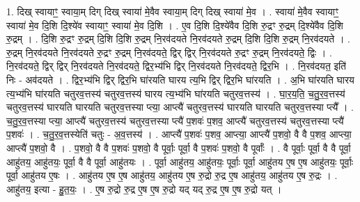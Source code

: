 \documentclass[17pt]{extarticle}
\begin{document}
1. दिख् स्वायाꣳ॒॒ स्वाया॒म् दिग् दिख् स्वाया॑ मे॒वैव स्वाया॒म् दिग् दिख् स्वाया॑ मे॒व । . स्वाया॑ मे॒वैव स्वायाꣳ॒॒ स्वाया॑ मे॒व दि॒शि दि॒श्ये॑व स्वायाꣳ॒॒ स्वाया॑ मे॒व दि॒शि । . ए॒व दि॒शि दि॒श्ये॑वैव दि॒शि रु॒द्रꣳ रु॒द्रम् दि॒श्ये॑वैव दि॒शि रु॒द्रम् । . दि॒शि रु॒द्रꣳ रु॒द्रम् दि॒शि दि॒शि रु॒द्रम् नि॒रव॑दयते नि॒रव॑दयते रु॒द्रम् दि॒शि दि॒शि रु॒द्रम् नि॒रव॑दयते । . रु॒द्रम् नि॒रव॑दयते नि॒रव॑दयते रु॒द्रꣳ रु॒द्रम् नि॒रव॑दयते॒ द्विर् द्विर् नि॒रव॑दयते रु॒द्रꣳ रु॒द्रम् नि॒रव॑दयते॒ द्विः । . नि॒रव॑दयते॒ द्विर् द्विर् नि॒रव॑दयते नि॒रव॑दयते॒ द्विर॒भ्य॑भि द्विर् नि॒रव॑दयते नि॒रव॑दयते॒ द्विर॒भि । . नि॒रव॑दयत॒ इति॑ निः - अव॑दयते । . द्विर॒भ्य॑भि द्विर् द्विर॒भि घा॑रयति घारय त्य॒भि द्विर् द्विर॒भि घा॑रयति । . अ॒भि घा॑रयति घारय त्य॒भ्य॑भि घा॑रयति चतुरव॒त्तस्य॑ चतुरव॒त्तस्य॑ घारय त्य॒भ्य॑भि घा॑रयति चतुरव॒त्तस्य॑ । . घा॒र॒य॒ति॒ च॒तु॒र॒व॒त्तस्य॑ चतुरव॒त्तस्य॑ घारयति घारयति चतुरव॒त्तस्या प्त्या॒ आप्त्यै॑ चतुरव॒त्तस्य॑ घारयति घारयति चतुरव॒त्तस्या प्त्यै᳚ । . च॒तु॒र॒व॒त्तस्या प्त्या॒ आप्त्यै॑ चतुरव॒त्तस्य॑ चतुरव॒त्तस्या प्त्यै॑ प॒शवः॑ प॒शव॒ आप्त्यै॑ चतुरव॒त्तस्य॑ चतुरव॒त्तस्या प्त्यै॑ प॒शवः॑ । . च॒तु॒र॒व॒त्तस्येति॑ चतुः - अ॒व॒त्तस्य॑ । . आप्त्यै॑ प॒शवः॑ प॒शव॒ आप्त्या॒ आप्त्यै॑ प॒शवो॒ वै वै प॒शव॒ आप्त्या॒ आप्त्यै॑ प॒शवो॒ वै । . प॒शवो॒ वै वै प॒शवः॑ प॒शवो॒ वै पूर्वाः॒ पूर्वा॒ वै प॒शवः॑ प॒शवो॒ वै पूर्वाः᳚ । . वै पूर्वाः॒ पूर्वा॒ वै वै पूर्वा॒ आहु॑तय॒ आहु॑तयः॒ पूर्वा॒ वै वै पूर्वा॒ आहु॑तयः । . पूर्वा॒ आहु॑तय॒ आहु॑तयः॒ पूर्वाः॒ पूर्वा॒ आहु॑तय ए॒ष ए॒ष आहु॑तयः॒ पूर्वाः॒ पूर्वा॒ आहु॑तय ए॒षः । . आहु॑तय ए॒ष ए॒ष आहु॑तय॒ आहु॑तय ए॒ष रु॒द्रो रु॒द्र ए॒ष आहु॑तय॒ आहु॑तय ए॒ष रु॒द्रः । . आहु॑तय॒ इत्या - हु॒त॒यः॒ । . ए॒ष रु॒द्रो रु॒द्र ए॒ष ए॒ष रु॒द्रो यद् यद् रु॒द्र ए॒ष ए॒ष रु॒द्रो यत् । \newline
\end{document}
